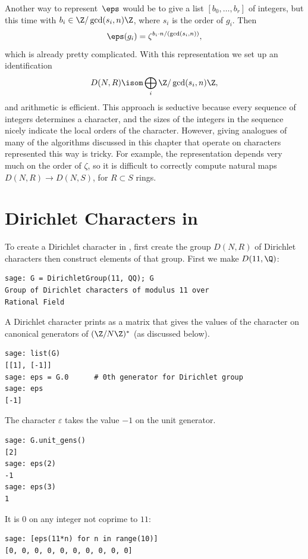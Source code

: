 Another way to represent~$\eps$ would be to give a list $[b_0,\ldots,
b_r]$ of integers, but this time with $b_i\in \Z/\gcd(s_i,n)\Z$, where
$s_i$ is the order of $g_i$.  Then 
$$\eps(g_i) = \zeta^{b_i \cdot
  n/(\gcd(s_i,n))},$$
which is already pretty complicated.  With this representation we set up an identification
$$
D(N,R)\isom \bigoplus_i \Z/\gcd(s_i,n)\Z, $$
and arithmetic is
efficient.  This approach is seductive because every sequence of
integers determines a character, and the sizes of the integers in the
sequence nicely indicate the local orders of the character.  However,
giving analogues of many of the algorithms discussed in this chapter
that operate on characters represented this way is tricky.  For
example, the representation depends very much on the order of $\zeta$,
so it is difficult to correctly compute natural maps $D(N,R) \to
D(N,S)$, for $R\subset S$ rings. 



\section{Dirichlet Characters in \sage}\label{sec:sagedir}
To create a Dirichlet character in \sage{}, first create
the group $D(N,R)$ of Dirichlet characters then construct
elements of that group.  First we make $D(11,\Q)$:
\begin{verbatim}
sage: G = DirichletGroup(11, QQ); G
Group of Dirichlet characters of modulus 11 over 
Rational Field
\end{verbatim}%

A Dirichlet character prints as a matrix that gives
the values of the character on canonical generators
of $(\Z/N\Z)^*$ (as discussed below).
\begin{verbatim}
sage: list(G)
[[1], [-1]]
sage: eps = G.0      # 0th generator for Dirichlet group
sage: eps
[-1]
\end{verbatim}%

The character $\varepsilon$ takes the value $-1$ on the
unit generator.
\begin{verbatim}
sage: G.unit_gens()  
[2]
sage: eps(2)
-1
sage: eps(3)
1
\end{verbatim}%

It is $0$ on any integer not coprime to $11$:
\begin{verbatim}
sage: [eps(11*n) for n in range(10)]  
[0, 0, 0, 0, 0, 0, 0, 0, 0, 0]
\end{verbatim}

